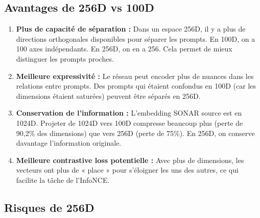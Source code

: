 \documentclass[11pt,a4paper]{article}
\begin{document}
\subsection{Avantages de 256D vs 100D}

\begin{enumerate}
    \item \textbf{Plus de capacité de séparation :} Dans un espace 256D, il y a plus de directions orthogonales disponibles pour séparer les prompts. En 100D, on a 100 axes indépendants. En 256D, on en a 256. Cela permet de mieux distinguer les prompts proches.
    
    \item \textbf{Meilleure expressivité :} Le réseau peut encoder plus de nuances dans les relations entre prompts. Des prompts qui étaient confondus en 100D (car les dimensions étaient saturées) peuvent être séparés en 256D.
    
    \item \textbf{Conservation de l'information :} L'embedding SONAR source est en 1024D. Projeter de 1024D vers 100D compresse beaucoup plus (perte de 90{,}2\% des dimensions) que vers 256D (perte de 75\%). En 256D, on conserve davantage l'information originale.
    
    \item \textbf{Meilleure contrastive loss potentielle :} Avec plus de dimensions, les vecteurs ont plus de « place » pour s'éloigner les uns des autres, ce qui facilite la tâche de l'InfoNCE.
\end{enumerate}

\subsection{Risques de 256D}
\end{document}
